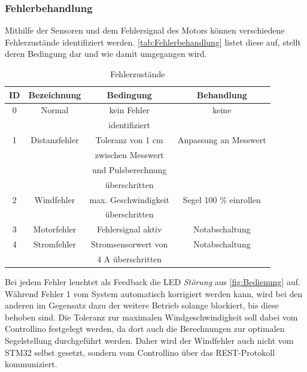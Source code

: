 \subsubsection{Fehlerbehandlung}\label{subsubsec:Fehlerbehandlung}
Mithilfe der Sensoren und dem Fehlersignal des Motors können verschiedene Fehlerzustände identifiziert werden. \autoref{tab:Fehlerbehandlung} listet diese auf, stellt deren Bedingung dar und wie damit umgegangen wird.
\begin{table}[H]
	\centering
	\begin{tabular}{|c|c|c|c|}
		                                                                                    \hline
		\textbf{ID} & \textbf{Bezeichnung} & \textbf{Bedingung}  & \textbf{Behandlung}   \\ \hline
		0           & Normal               & kein Fehler         & keine                 \\
		            &                      & identifiziert       &                       \\ \hline
		1           & Distanzfehler        & Toleranz von 1 cm   & Anpassung an Messwert \\
		            &                      & zwischen Messwert   &                       \\
		            &                      & und Pulsberechnung  &                       \\
		            &                      & überschritten       &                       \\ \hline
		2           & Windfehler           & max. Geschwindigkeit& Segel 100 \% einrollen\\
		            &                      & überschritten       &                       \\ \hline
		3           & Motorfehler          & Fehlersignal aktiv  & Notabschaltung        \\ \hline
		4           & Stromfehler          & Stromsensorwert von & Notabschaltung        \\
		            &                      & 4 A überschritten   &                       \\ \hline
	\end{tabular}%
	\caption{Fehlerzustände}
	\label{tab:Fehlerbehandlung}
\end{table}
\noindent
Bei jedem Fehler leuchtet als Feedback die LED \textit{Störung} aus \autoref{fig:Bedienung} auf. Während Fehler 1 vom System automatisch korrigiert werden kann, wird bei den anderen im Gegensatz dazu der weitere Betrieb solange blockiert, bis diese behoben sind. Die Toleranz zur maximalen Windgeschwindigkeit soll dabei vom Controllino festgelegt werden, da dort auch die Berechnungen zur optimalen Segelstellung durchgeführt werden. Daher wird der Windfehler auch nicht vom STM32 selbst gesetzt, sondern vom Controllino über das REST-Protokoll kommuniziert.
